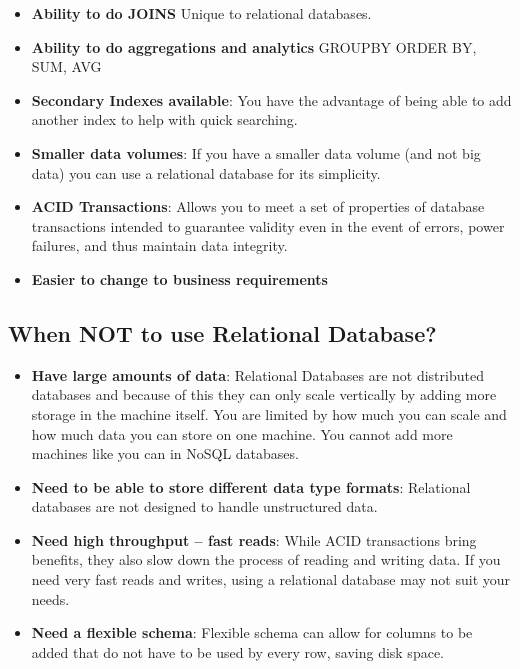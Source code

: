 \documentclass[
	paper=a4,%
	pagesize,%
	8pt, fleqn,%
	headings=small,%
	notitlepage,%
	parskip=never]%
	{scrreprt}
\begin{document}
\begin{multicols*}{3}
\begin{itemize}
\item \textbf{Ability to do JOINS} Unique to relational databases. 

\item \textbf{Ability to do aggregations and analytics} GROUPBY ORDER BY, SUM, AVG

\item \textbf{Secondary Indexes available}: You have the advantage of being able to add another index to help with quick searching.

\item \textbf{Smaller data volumes}: If you have a smaller data volume (and not big data) you can use a relational database for its simplicity.

\item \textbf{ACID Transactions}: Allows you to meet a set of properties of database transactions intended to guarantee validity even in the event of errors, power failures, and thus maintain data integrity.

\item \textbf{Easier to change to business requirements}

\end{itemize}

\subsection{When NOT to use Relational Database?} \label{relational_disad}
\begin{itemize}
\item \textbf{Have large amounts of data}: Relational Databases are not distributed databases and because of this they can only scale vertically by adding more storage in the machine itself. You are limited by how much you can scale and how much data you can store on one machine. You cannot add more machines like you can in NoSQL databases.

\item \textbf{Need to be able to store different data type formats}: Relational databases are not designed to handle unstructured data.

\item \textbf{Need high throughput -- fast reads}: While ACID transactions bring benefits, they also slow down the process of reading and writing data. If you need very fast reads and writes, using a relational database may not suit your needs.

\item \textbf{Need a flexible schema}: Flexible schema can allow for columns to be added that do not have to be used by every row, saving disk space.


\end{itemize}
\end{multicols*}
\end{document}
